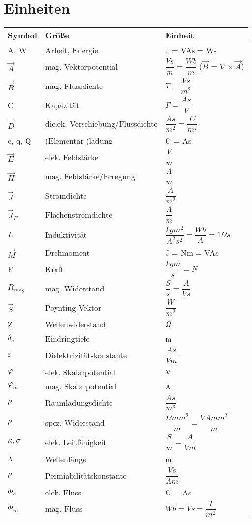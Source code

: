 \section{Einheiten} \label{sec:Einheiten}
\renewcommand{\arraystretch}{2.15}
\begin{tabular}{l|l|l}
    \hline
    Symbol & Größe & Einheit\\
    \hline 
    A, W & Arbeit, Energie & J = VAs = Ws\\
    $\vec{A}$ & mag. Vektorpotential & $\dfrac{Vs}{m} = \dfrac{Wb}{m}$ ($\vec{B}$ = $\nabla \times \vec{A}$)\\
    $\vec{B}$ & mag. Flussdichte & $T = \dfrac{Vs}{m^2}$\\
    C & Kapazität & $F = \dfrac{As}{V}$\\
    $\vec{D}$ & dielek. Verschiebung/Flussdichte & $\dfrac{As}{m^2} = \dfrac{C}{m^2}$\\
    e, q, Q & (Elementar-)ladung & C = As\\
    $\vec{E}$ & elek. Feldstärke & $\dfrac{V}{m}$ \\
    $\vec{H}$ & mag. Feldstärke/Erregung & $\dfrac{A}{m}$\\
    $\vec{J}$ & Stromdichte & $\dfrac{A}{m^2}$\\
    $\vec{J}_F$ & Flächenstromdichte & $\dfrac{A}{m}$\\
    $L$ & Induktivität & $\dfrac{kgm^2}{A^2s^2} = \dfrac{Wb}{A} = 1 \Omega s$ \\
    $\vec{M}$ & Drehmoment & J = Nm = VAs\\
    F & Kraft & $\dfrac{kgm}{s} = N$\\
    $R_{mag}$ & mag. Widerstand & $\dfrac{S}{s} = \dfrac{A}{Vs}$\\
    $\vec{S}$ & Poynting-Vektor & $\dfrac{W}{m^2}$\\
    Z & Wellenwiderstand & $\Omega$\\
    $\delta_s$ & Eindringtiefe & m \\
    $\varepsilon$ & Dielektrizitätskonstante & $\dfrac{As}{Vm}$\\
    $\varphi$ & elek. Skalarpotential & V \\
    $\varphi_m$ & mag. Skalarpotential & A \\
    $\rho$ & Raumladungsdichte & $\dfrac{As}{m^3}$\\
    $\rho$ & spez. Widerstand & $\dfrac{\Omega mm^2}{m} = \dfrac{VA mm^2}{m}$\\
    $\kappa, \sigma$ & elek. Leitfähigkeit & $\dfrac{S}{m} = \dfrac{A}{Vm}$\\
    $\lambda$ & Wellenlänge & m\\
    $\mu$ & Permiabilitätskonstante & $\dfrac{Vs}{Am}$\\
    $\Phi_e$ & elek. Fluss & C = As\\
    $\Phi_m$ & mag. Fluss & $Wb = Vs = \dfrac{T}{m^2}$\\

    \hline
\end{tabular} 